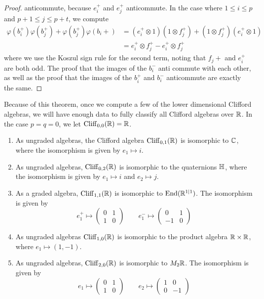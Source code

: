 \begin{proof}
anticommute, because $e_i^+$ and $e_j^+$ anticommute. In the case where
$1 \leq i \leq p$ and $p+1 \leq j \leq p+t$, we compute
%
\begin{align*}
\varphi(b_i^+)\varphi(b_j^+) + \varphi(b_j^+)\varphi(b_i+) &=
(e_i^+ \otimes 1)(1 \otimes f_j^+) + (1\otimes f_j^+)(e_i^+ \otimes 1) \\
&= e_i^+ \otimes f_j^+ - e_i^+ \otimes f_j^+
\end{align*}
where we use the Koszul sign rule for the second term, noting that $f_j+$ and
$e_i^+$ are both odd. The proof that the images of the $b_i^-$ anti commute with
each other, as well as the proof that the images of the $b_i^+$ and $b_i^-$
anticommute are exactly the same.
%
\end{proof}
%
Because of this theorem, once we compute a few of the lower dimensional
Clifford algebras, we will have enough data to fully classify all Clifford
algebras over $\mathbb{R}$. In the case $p = q = 0$, we let $\operatorname{Cliff}_{0,0}(\mathbb{R}) = \mathbb{R}$.
%
\begin{exmp}\enumbreak
\begin{enumerate}
  \item As ungraded algebras, the Clifford algebra $\operatorname{Cliff}_{0,1}(\mathbb{R})$ is isomorphic
  to $\mathbb{C}$, where the isomorphism is given by $e_1 \mapsto i$.
  \item As ungraded algebras, $\operatorname{Cliff}_{0,2}(\mathbb{R})$ is isomorphic to the quaternions
  $\mathbb{H}$, where the isomorphism is given by $e_1 \mapsto i$ and $e_2 \mapsto j$.
  \item As a graded algebra, $\operatorname{Cliff}_{1,1}(\mathbb{R})$ is isomorphic to $\operatorname{End}(\mathbb{R}^{1|1})$.
  The isomorphism is given by
  \[
  e_1^+ \mapsto \begin{pmatrix}
  0 & 1 \\
  1 & 0
  \end{pmatrix} \qquad e_1^- \mapsto \begin{pmatrix}
  0 & 1 \\
  -1 & 0
  \end{pmatrix}
  \]
  \item As ungraded algebras $\operatorname{Cliff}_{1,0}(\mathbb{R})$ is isomorphic to the product
  algebra $\mathbb{R} \times \mathbb{R}$, where $e_1 \mapsto (1,-1)$.
  \item As ungraded algebras, $\operatorname{Cliff}_{2,0}(\mathbb{R})$ is isomorphic to $M_2\mathbb{R}$. The
  isomorphism is given by
  \[
  e_1 \mapsto \begin{pmatrix}
  0 & 1 \\
  1 & 0
  \end{pmatrix} \qquad e_2 \mapsto \begin{pmatrix}
  1 & 0 \\
  0 & -1
  \end{pmatrix}
  \]
\end{enumerate}
\end{exmp}
